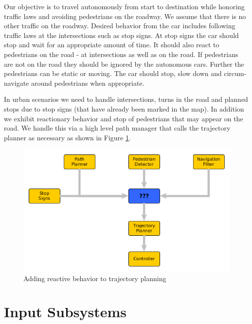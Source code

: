 \documentclass[letterpaper, 10 pt, conference]{ieeeconf}  %
\begin{document}
Our objective is to travel autonomously from start to destination while honoring traffic laws and avoiding pedestrians on the roadway. We assume that there is no other traffic on the roadway. Desired behavior from the car includes following traffic laws at the intersections such as stop signs. At stop signs the car should stop and wait for an appropriate amount of time. It should also react to pedestrians on the road - at intersections as well as on the road. If pedestrians are not on the road they should be ignored by the autonomous cars. Further the pedestrians can be static or moving. The car should stop, slow down and circum-navigate around pedestrians when appropriate.


In urban scenarios we need to handle intersections, turns in the road and planned stops due 
to stop signs (that have already been marked in the map). In addition we exhibit reactionary 
behavior and stop of pedestrians that may appear on the road. We handle this via a high 
level path manager that calls the trajectory planner as necessary as shown in Figure \ref{fig:addreact}.

\begin{figure}[thpb]
  \centering
  \includegraphics[width=1.0\columnwidth]{graphics/MissingReactionPiece2.png}
  \caption{Adding reactive behavior to trajectory planning}
  \label{fig:addreact}
\end{figure}
					


\section{Input Subsystems} \label{sec:inputsubsystems}
\end{document}
